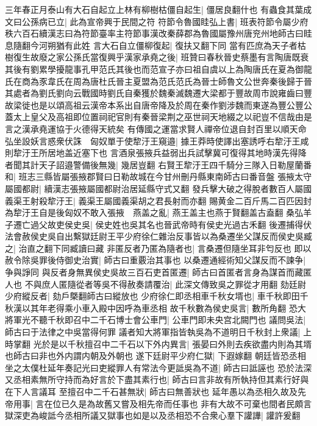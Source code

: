 三年春正月泰山有大石自起立上林有柳樹枯僵自起生|{
	僵居良翻什也}
有蟲食其葉成文曰公孫病已立|{
	此為宣帝興于民間之符}
符節令魯國眭弘上書|{
	班表符節令屬少府秩六百石續漢志曰為符節臺率主符節事漢改秦薛郡為魯國屬豫州唐兖州地師古曰眭息隨翻今河朔猶有此姓}
言大石自立僵柳復起|{
	復扶又翻下同}
當有匹庶為天子者枯樹復生故廢之家公孫氏當復興乎漢家承堯之後|{
	班贊曰春秋晉史蔡墨有言陶唐既衰其後有劉累學擾龍事孔甲范氏其後也而范宣子亦曰祖自虞以上為陶唐氏在夏為御龍氏在商為豕韋氏在周為唐杜氏晉主夏盟為范氏范氏為晉士師魯文公世奔秦後歸于晉其處者為劉氏劉向云戰國時劉氏自秦獲於魏秦滅魏遷大梁都于豐故周市說雍齒曰豐故梁徙也是以頌高祖云漢帝本系出自唐帝降及於周在秦作劉涉魏而東遂為豐公豐公蓋太上皇父及高祖即位置祠祀官則有秦晉梁荆之巫世祠天地綴之以祀豈不信哉由是言之漢承堯運協于火德得天統矣}
有傳國之運當求賢人禪帝位退自封百里以順天命弘坐設妖言惑衆伏誅　匈奴單于使犂汙王窺邉|{
	據王莽時使譯出塞誘呼右犂汙王咸則犂汙王所居地盖近塞下也}
言酒泉張掖兵益弱出兵試擊冀可復得其地時漢先得降者聞其計天子詔邉警備後無幾|{
	幾居豈翻}
右賢王犂汙王四千騎分三隊入日勒屋蘭番和|{
	班志三縣皆屬張掖郡賢曰日勒故城在今甘州刪丹縣東南師古曰番音盤}
張掖太守屬國都尉|{
	續漢志張掖屬國都尉治居延縣守式又翻}
發兵擊大破之得脫者數百人屬國義渠王射殺犂汙王|{
	義渠王屬國義渠胡之君長射而亦翻}
賜黄金二百斤馬二百匹因封為犂汙王自是後匈奴不敢入張掖　燕盖之亂|{
	燕王盖主也燕于賢翻盖古盍翻}
桑弘羊子遷亡過父故吏侯史吳|{
	侯史姓也吳其名也晉武帝時有侯史光過古禾翻}
後遷捕得伏法會赦侯史吳自出繫獄廷尉王平少府徐仁雜治反事皆以為桑遷坐父謀反而侯史吳臧之|{
	治直之翻下同臧讀曰藏}
非匿反者乃匿為隨者也|{
	言桑遷但隨坐耳非匄反也}
即以赦令除吳罪後侍御史治實|{
	師古曰重覈治其事也}
以桑遷通經術知父謀反而不諫争|{
	争與諍同}
與反者身無異侯史吳故三百石吏首匿遷|{
	師古曰首匿者言身為謀首而藏匿人也}
不與庶人匿隨從者等吳不得赦奏請覆治|{
	此深文傳致吳之罪從才用翻}
劾廷尉少府縱反者|{
	劾戶槩翻師古曰縱放也}
少府徐仁即丞相車千秋女壻也|{
	車千秋即田千秋漢以其年老得乘小車入殿中因呼為車丞相}
故千秋數為侯史吳言|{
	數所角翻}
恐大將軍光不聽千秋即召中二千石博士會公車門|{
	公車門即未央宫北闕門也}
議問吳法|{
	師古曰于法律之中吳當得何罪}
議者知大將軍指皆執吳為不道明日千秋封上衆議|{
	上時掌翻}
光於是以千秋擅召中二千石以下外内異言|{
	張晏曰外則去疾欲盡内則為其壻也師古曰非也外内謂内朝及外朝也}
遂下廷尉平少府仁獄|{
	下遐嫁翻}
朝廷皆恐丞相坐之太僕杜延年奏記光曰吏縱罪人有常法今更詆吳為不道|{
	師古曰詆誣也}
恐於法深又丞相素無所守持而為好言於下盡其素行也|{
	師古曰言非故有所執持但其素行好與在下人言議耳}
至擅召中二千石甚無狀|{
	師古曰無善狀也}
延年愚以為丞相久故及先帝用事|{
	言在位已久是為故舊又嘗及相先帝而任事也}
非有大故不可棄也間者民頗言獄深吏為峻詆今丞相所議又獄事也如是以及丞相恐不合衆心羣下讙譁|{
	讙許爰翻}
